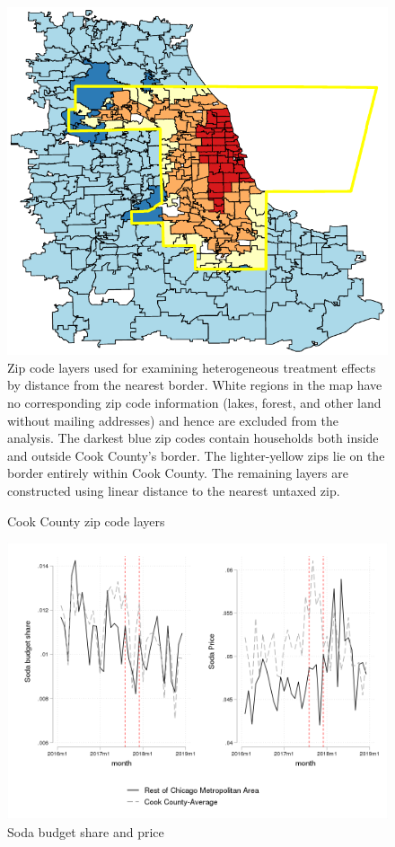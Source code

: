 \documentclass[12pt]{article}
\begin{document}
\clearpage
\begin{figure}[t]\centering
  \caption{Cook County zip code layers} \label{cookzip}
	\includegraphics[width = \textwidth]{../figures/cookzips.pdf}
	\footnotesize Zip code layers used for examining heterogeneous treatment effects by distance from the nearest border. White regions in the map have no corresponding zip code information (lakes, forest, and other land without mailing addresses) and hence are excluded from the analysis. The darkest blue zip codes contain households both inside and outside Cook County's border. The lighter-yellow zips lie on the border entirely within Cook County. The remaining layers are constructed using linear distance to the nearest untaxed zip.
\end{figure}

\clearpage
\begin{figure}[t]\centering
  \caption{Soda budget share and price} \label{soda_price}
  \includegraphics[width = \textwidth]{../figures/server_output/soda_price_and_share.png}
\end{figure}
\end{document}
